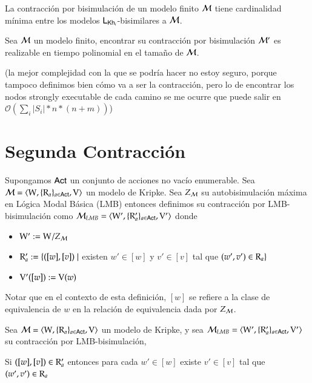 \begin{teorema}
    La contracción por bisimulación de un modelo finito $\mathcal{M}$ tiene cardinalidad mínima entre los modelos $\mathsf{L}_{\mathsf{Kh}_i}$-bisimilares a $\mathcal{M}$.
\end{teorema}



\begin{teorema}
    Sea $\mathcal{M}$ un modelo finito, encontrar su contracción por bisimulación $\mathcal{M}'$ es realizable en tiempo polinomial en el tamaño de $\mathcal{M}$.
\end{teorema}

(la mejor complejidad con la que se podría hacer no estoy seguro, porque tampoco definimos bien cómo va a ser la contracción, pero lo de encontrar los nodos strongly executable de cada camino se me ocurre que puede salir en $\mathcal{O}(\sum_{i} |S_i|*n*(n+m))$)


\section{Segunda Contracción}

\begin{definicion}
    Supongamos ${\rm \sf Act}$ un conjunto de acciones no vacío enumerable.
    Sea $\mathcal{M} = \langle \mathrm{W},\{\mathrm{R}_a\}_{a\in{\rm \sf Act}},\mathrm{V} \rangle$ un modelo de Kripke. Sea $Z_{\mathcal{M}}$ su autobisimulación máxima en Lógica Modal Básica (LMB) entonces definimos su contracción por LMB-bisimulación como $\mathcal{M}_{LMB} = \langle \mathrm{W}',\{\mathrm{R}'_a\}_{a\in{\rm \sf Act}},\mathrm{V}' \rangle$ donde
    \begin{center}
        \begin{itemize}
            \item $\mathrm{W}' := \mathrm{W} /Z_{\mathcal{M}}$
            \item $\mathrm{R}_a' := \{([w],[v]) \mid$ existen $w' \in [w]$ y $v' \in [v]$ tal que $(w',v') \in \mathrm{R}_a \}$
            \item $\mathrm{V}'([w]) := \mathrm{V}(w)$
        \end{itemize}
    \end{center} 
\end{definicion}

Notar que en el contexto de esta definición, $[w]$ se refiere a la clase de equivalencia de $w$ en la relación de equivalencia dada por $Z_{\mathcal{M}}$. 


\begin{lema}
    Sea $\mathcal{M} = \langle \mathrm{W},\{\mathrm{R}_a\}_{a\in{\rm \sf Act}},\mathrm{V} \rangle$ un modelo de Kripke, y sea $\mathcal{M}_{LMB} = \langle \mathrm{W}',\{\mathrm{R}_a'\}_{a\in{\rm \sf Act}},\mathrm{V}' \rangle$ su contracción por LMB-bisimulación,
    \begin{center}
        Si $([w],[v]) \in \mathrm{R}'_a$ entonces para cada $w' \in [w]$ existe $v' \in [v]$ tal que $(w',v') \in \mathrm{R}_a$
    \end{center}
\end{lema}




